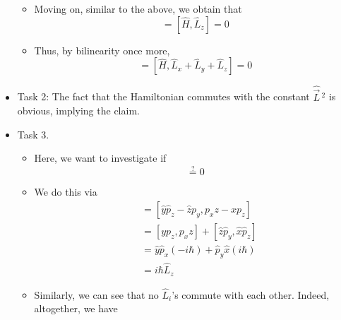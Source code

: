 \documentclass[../notes.tex]{subfiles}
\begin{document}
\begin{itemize}
\begin{itemize}
        \item Moving on, similar to the above, we obtain that
        \begin{equation*}
            [\hat{H},\hat{L}_y] = [\hat{H},\hat{L}_z] = 0
        \end{equation*}
        \item Thus, by bilinearity once more,
        \begin{equation*}
            [\hat{H},\hat{\vec{L}}] = [\hat{H},\hat{L}_x+\hat{L}_y+\hat{L}_z] = 0
        \end{equation*}
    \end{itemize}
    \item Task 2: The fact that the Hamiltonian commutes with the constant $\hat{\vec{L}}{\,}^2$ is obvious, implying the claim.
    \item Task 3.
    \begin{itemize}
        \item Here, we want to investigate if
        \begin{equation*}
            [\hat{L}_x,\hat{L}_y] \stackrel{?}{=} 0
        \end{equation*}
        \item We do this via
        \begin{align*}
            [\hat{L}_x,\hat{L}_y] &= [\hat{y}\hat{p}_z-\hat{z}p_y,p_xz-xp_z]\\
            &= [yp_z,p_xz]+[\hat{z}\hat{p}_y,\hat{x}\hat{p}_z]\\
            &= \hat{y}\hat{p}_x(-i\hbar)+\hat{p}_y\hat{x}(i\hbar)\\
            &= i\hbar\hat{L}_z
        \end{align*}
        \item Similarly, we can see that no $\hat{L}_i$'s commute with each other. Indeed, altogether, we have
        \begin{align*}

\end{align*}
\end{itemize}
\end{itemize}
\end{document}
